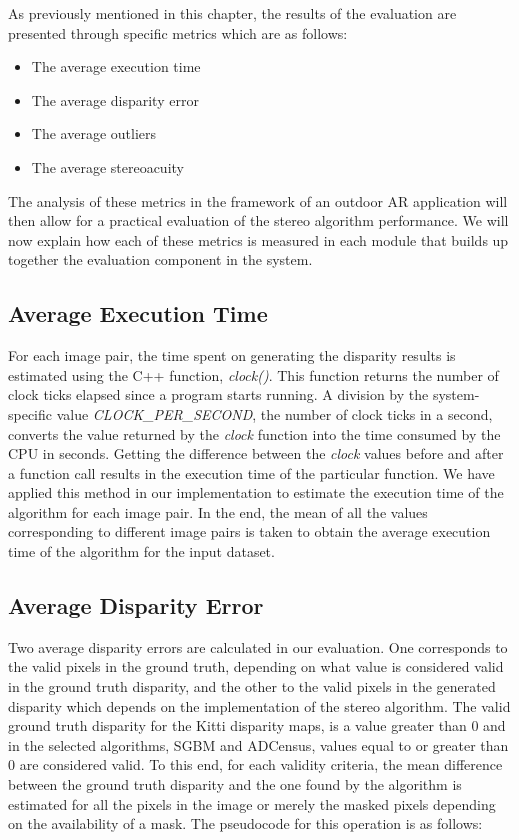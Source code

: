As previously mentioned in this chapter, the results of the evaluation are presented through specific metrics which are as follows:

\begin{itemize}
\item{The average execution time}
\item{The average disparity error}
\item{The average outliers}
\item{The average stereoacuity}
\end{itemize}

The analysis of these metrics in the framework of an outdoor AR application will then allow for a practical evaluation of the stereo algorithm performance.
We will now explain how each of these metrics is measured in each module that builds up together the evaluation component in the system.

\subsection{Average Execution Time}
For each image pair, the time spent on generating the disparity results is estimated using the C++ function, \textit{clock()}. 
This function returns the number of clock ticks elapsed
since a program starts running. A division by the system-specific value \textit{CLOCK\_PER\_SECOND}, the number of clock ticks in a second, 
converts the value returned by the \textit{clock} function into the time consumed by the CPU in seconds.
Getting the difference between the \textit{clock} values before and after a function call results in the execution time
of the particular function. 
We have applied this method in our implementation to estimate the execution time of the algorithm for each image pair. In the end, the mean of all
the values corresponding to different image pairs is taken to obtain the average execution time of the algorithm for the input dataset.

\subsection{Average Disparity Error}
Two average disparity errors are calculated in our evaluation. One corresponds to the valid pixels in the ground truth, depending on what value is considered valid
in the ground truth disparity, and the other to
the valid pixels in the generated disparity which depends on the implementation of the stereo algorithm.
The valid ground truth disparity for the Kitti disparity maps, is a value greater than 0 and in the selected algorithms, SGBM and ADCensus, 
values equal to or greater than 0 are considered valid.
To this end, for each validity criteria, the mean difference between the ground truth disparity and the one found by the algorithm
is estimated for all the pixels in the image or merely the masked pixels depending on the availability of a mask. 
The pseudocode for this operation is as follows:

